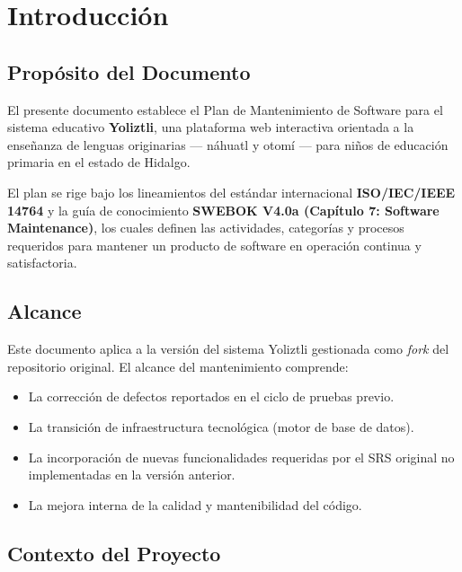 
\chapter{Introducción}

\section{Propósito del Documento}

El presente documento establece el Plan de Mantenimiento de Software para el sistema
educativo \textbf{Yoliztli}, una plataforma web interactiva orientada a la enseñanza de
lenguas originarias --- náhuatl y otomí --- para niños de educación primaria en el estado
de Hidalgo.

El plan se rige bajo los lineamientos del estándar internacional \textbf{ISO/IEC/IEEE 14764}
y la guía de conocimiento \textbf{SWEBOK V4.0a (Capítulo 7: Software Maintenance)}, los
cuales definen las actividades, categorías y procesos requeridos para mantener un producto
de software en operación continua y satisfactoria.

\section{Alcance}

Este documento aplica a la versión del sistema Yoliztli gestionada como \textit{fork} del
repositorio original. El alcance del mantenimiento comprende:

\begin{itemize}
    \item La corrección de defectos reportados en el ciclo de pruebas previo.
    \item La transición de infraestructura tecnológica (motor de base de datos).
    \item La incorporación de nuevas funcionalidades requeridas por el SRS original no
          implementadas en la versión anterior.
    \item La mejora interna de la calidad y mantenibilidad del código.
\end{itemize}

\section{Contexto del Proyecto}


